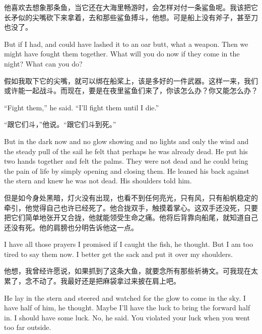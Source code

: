 \begin{paracol}{2}
\switchcolumn

他喜欢去想象那条鱼，当它还在大海里畅游时，会怎样对付一条鲨鱼呢。我该把它长矛似的尖嘴砍下来拿着，去和那些鲨鱼搏斗，他想。可是船上没有斧子，甚至刀也没了。

\switchcolumn*

But if I had, and could have lashed it to an oar butt, what a weapon.
Then we might have fought them together. What will you do now if they come
in the night? What can you do?

\switchcolumn

假如我取下它的尖嘴，就可以绑在船桨上，该是多好的一件武器。这样一来，我们或许能一起战斗。而现在，要是在夜里鲨鱼们来了，你该怎么办？你又能怎么办？

\switchcolumn*

``Fight them,'' he said. ``I'll fight them until I die.''

\switchcolumn

“跟它们斗，”他说。“跟它们斗到死。”

\switchcolumn*

But in the dark now and no glow showing and no lights and only the wind and
the steady pull of the sail he felt that perhaps he was already dead. He put
his two hands together and felt the palms. They were not dead and he could
bring the pain of life by simply opening and closing them. He leaned his
back against the stern and knew he was not dead. His shoulders told him.

\switchcolumn

但是如今身处黑暗，灯火没有出现，也看不到任何亮光，只有风，只有船帆稳定的牵引，他觉得自己也许已经死了。他合拢双手，触摸着掌心。这双手还没死，只要把它们简单地张开又合拢，他就能领受生命之痛。他将后背靠向船尾，就知道自己还没有死。他的肩膀也分明告诉他这一点。

\switchcolumn*

I have all those prayers I promised if I caught the fish, he thought. But I
am too tired to say them now. I better get the sack and put it over my
shoulders.

\switchcolumn

他想，我曾经许愿说，如果抓到了这条大鱼，就要念所有那些祈祷文。可我现在太累了，念不动了。我最好还是把麻袋拿过来披在肩上吧。

\switchcolumn*

He lay in the stern and steered and watched for the glow to come in the
sky. I have half of him, he thought. Maybe I'll have the luck to bring the
forward half in. I should have some luck. No, he said. You \gls{violated} your
luck when you went too far outside.


\end{paracol}

